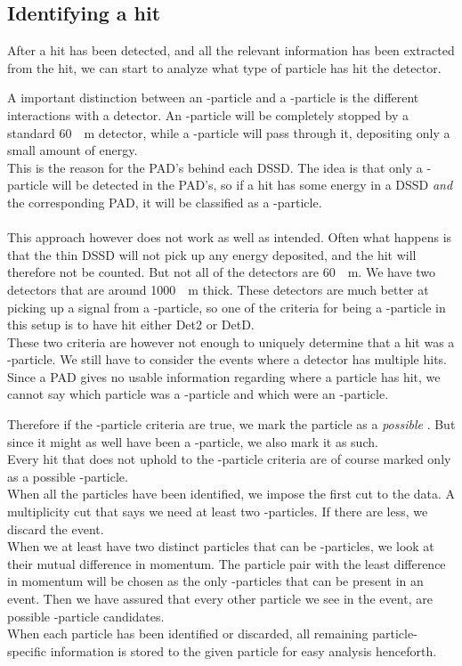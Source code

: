 \subsection{Identifying a hit}
After a hit has been detected, and all the relevant information has been extracted from the hit, we can start to analyze what type of particle has hit the detector. 

A important distinction between an \al-particle and a \be-particle is the different interactions with a detector. An \al-particle will be completely stopped by a standard \SI{60}{\mu m} detector, while a \be-particle will pass through it, depositing only a small amount of energy. \\
This is the reason for the PAD's behind each DSSD. The idea is that only a \be-particle will be detected in the PAD's, so if a hit has some energy in a DSSD \textit{and} the corresponding PAD, it will be classified as a \be-particle.\\
\\
This approach however does not work as well as intended. Often what happens is that the thin DSSD will not pick up any energy deposited, and the hit will therefore not be counted. 
But not all of the detectors are \SI{60}{\mu m}. We have two detectors that are around \SI{1000}{\mu m} thick. These detectors are much better at picking up a signal from a \be-particle, so one of the criteria for being a \be-particle in this setup is to have hit either Det2 or DetD.\\

These two criteria are however not enough to uniquely determine that a hit was a \be-particle. We still have to consider the events where a detector has multiple hits. Since a PAD gives no usable information regarding where a particle has hit, we cannot say which particle was a \be-particle and which were an \al-particle. 

Therefore if the \be-particle criteria are true, we mark the particle as a \textit{possible} \be. But since it might as well have been a \al-particle, we also mark it as such.\\
Every hit that does not uphold to the \be-particle criteria are of course marked only as a possible \al-particle.
\\
%
When all the particles have been identified, we impose the first cut to the data. A multiplicity cut that says we need at least two \al-particles. If there are less, we discard the event. 
\\
When we at least have two distinct particles that can be \al-particles, we look at their mutual difference in momentum. The particle pair with the least difference in momentum will be chosen as the only \al-particles that can be present in an event. Then we have assured that every other particle we see in the event, are possible \be-particle candidates. 
\\
When each particle has been identified or discarded, all remaining particle-specific information is stored to the given particle for easy analysis henceforth.

